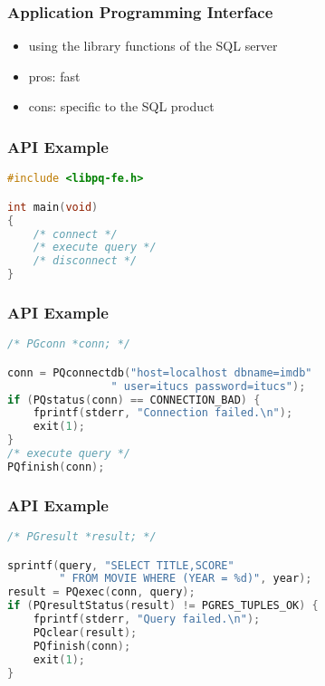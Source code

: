 \documentclass[dvipsnames]{beamer}
\theoremstyle{plain}
\begin{document}
\begin{frame}
  \frametitle{Application Programming Interface}

  \begin{itemize}
    \item using the library functions of the SQL server

    \pause
    \bigskip
    \item pros: fast
    \item cons: specific to the SQL product
  \end{itemize}
\end{frame}

\begin{frame}[fragile]
  \frametitle{API Example}

  \begin{example}[PostgreSQL - C]
    \begin{lstlisting}[language=C]
#include <libpq-fe.h>

int main(void)
{
    /* connect */
    /* execute query */
    /* disconnect */
}
    \end{lstlisting}
  \end{example}
\end{frame}

\begin{frame}[fragile]
  \frametitle{API Example}

  \begin{example}[connecting]
    \begin{lstlisting}[language=C]
/* PGconn *conn; */

conn = PQconnectdb("host=localhost dbname=imdb"
                " user=itucs password=itucs");
if (PQstatus(conn) == CONNECTION_BAD) {
    fprintf(stderr, "Connection failed.\n");
    exit(1);
}
/* execute query */
PQfinish(conn);
    \end{lstlisting}
  \end{example}
\end{frame}

\begin{frame}[fragile]
  \frametitle{API Example}

  \begin{example}
    \begin{lstlisting}[language=C]
/* PGresult *result; */

sprintf(query, "SELECT TITLE,SCORE"
        " FROM MOVIE WHERE (YEAR = %d)", year);
result = PQexec(conn, query);
if (PQresultStatus(result) != PGRES_TUPLES_OK) {
    fprintf(stderr, "Query failed.\n");
    PQclear(result);
    PQfinish(conn);
    exit(1);
}
    \end{lstlisting}
  \end{example}
\end{frame}
\end{document}
